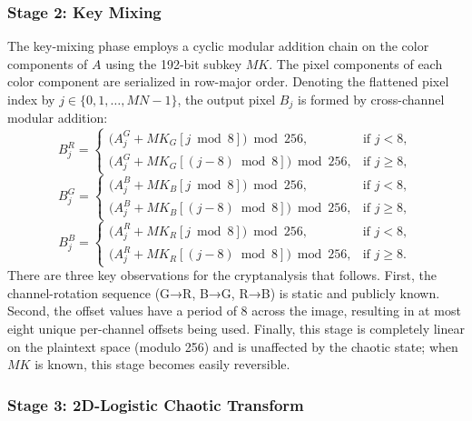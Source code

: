 \subsubsection{Stage 2: Key Mixing}
\label{subsubsec:key_mixing}

The key-mixing phase employs a cyclic modular addition chain on
the color components of $A$ using the 192-bit subkey $MK$. 
The pixel components of each color component are serialized in row-major order.
Denoting the flattened pixel index by $j \in \{0, 1, \ldots, MN-1\}$,
the output pixel $B_j$ is formed by cross-channel modular addition:
\begin{equation}
B_{j}^{R} =
\begin{cases}
\bigl(A_{j}^{G} + MK_G[j \bmod 8]\bigr) \bmod 256,
        & \text{if } j < 8, \\[4pt]
\bigl(A_{j}^{G} + MK_G[(j-8) \bmod 8]\bigr) \bmod 256,
        & \text{if } j \geq 8,
\end{cases}
\label{eq:keymix_R}
\end{equation}
\begin{equation}
B_{j}^{G} =
\begin{cases}
\bigl(A_{j}^{B} + MK_B[j \bmod 8]\bigr) \bmod 256,
        & \text{if } j < 8, \\[4pt]
\bigl(A_{j}^{B} + MK_B[(j-8) \bmod 8]\bigr) \bmod 256,
        & \text{if } j \geq 8,
\end{cases}
\label{eq:keymix_G}
\end{equation}
\begin{equation}
B_{j}^{B} =
\begin{cases}
\bigl(A_{j}^{R} + MK_R[j \bmod 8]\bigr) \bmod 256,
        & \text{if } j < 8, \\[4pt]
\bigl(A_{j}^{R} + MK_R[(j-8) \bmod 8]\bigr) \bmod 256,
        & \text{if } j \geq 8.
\end{cases}
\label{eq:keymix_B}
\end{equation}
There are three key observations for the cryptanalysis that follows.
First, the channel-rotation sequence (G→R, B→G, R→B)
is static and publicly known.
Second, the offset values have a period of 8 across the image,
resulting in at most eight unique per-channel offsets being used.
Finally, this stage is completely linear on the plaintext space
(modulo 256) and is unaffected by the chaotic state; when $MK$ is known,
this stage becomes easily reversible.

\subsubsection{Stage 3: 2D-Logistic Chaotic Transform}
\label{subsubsec:logistic_transform}

